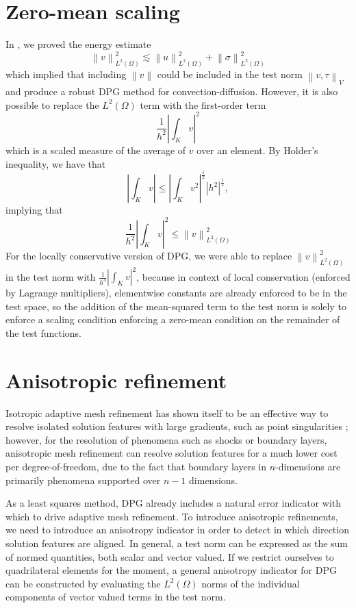 \documentclass[11pt,onecolumn]{scrartcl}
\newcommand{\nor}[1]{\left\| #1 \right\|}
\newcommand{\LRp}[1]{\left( #1 \right)}
\newcommand{\LRb}[1]{\left| #1 \right|}
\renewcommand{\L}{L^2\LRp{\Omega}}
\begin{document}
\section{Zero-mean scaling}

In \cite{DPGrobustness, ChanHeuerBui-ThanhDemkowicz12}, we proved the energy estimate
\[
\nor{v}^2_{\L} \lesssim \nor{u}^2_{\L} + \nor{\sigma}^2_{\L}
\]
which implied that including $\nor{v}$ could be included in the test norm $\nor{v,\tau}_V$ and produce a robust DPG method for convection-diffusion.  However, it is also possible to replace the $\L$ term with the first-order term 
\[
\frac{1}{h^2}\LRb{\int_K v}^2
\]
which is a scaled measure of the average of $v$ over an element.  By Holder's inequality, we have that 
\[
\LRb{\int_K v} \leq \LRb{\int_K v^2}^{\frac{1}{2}} \LRb{h^2}^{\frac{1}{2}}, 
\]
implying that 
\[
\frac{1}{h^2}\LRb{\int_K v}^2 \leq \nor{v}^2_{\L}
\]
For the locally conservative version of DPG, we were able to replace $\nor{v}^2_{\L}$ in the test norm with $\frac{1}{h^4}\LRb{\int_K v}^2$, because in context of local conservation (enforced by Lagrange multipliers), elementwise constants are already enforced to be in the test space, so the addition of the mean-squared term to the test norm is solely to enforce a scaling condition enforcing a zero-mean condition on the remainder of the test functions.

\section{Anisotropic refinement}

Isotropic adaptive mesh refinement has shown itself to be an effective way to resolve isolated solution features with large gradients, such as point singularities \cite{FindBabuskaPaper}; however, for the resolution of phenomena such as shocks or boundary layers, anisotropic mesh refinement can resolve solution features for a much lower cost per degree-of-freedom, due to the fact that boundary layers in $n$-dimensions are primarily phenomena supported over $n-1$ dimensions.  

As a least squares method, DPG already includes a natural error indicator with which to drive adaptive mesh refinement.  To introduce anisotropic refinements, we need to introduce an anisotropy indicator in order to detect in which direction solution features are aligned.  In general, a test norm can be expressed as the sum of normed quantities, both scalar and vector valued.  If we restrict ourselves to quadrilateral elements for the moment, a general anisotropy indicator for DPG can be constructed by evaluating the $\L$ norms of the individual components of vector valued terms in the test norm.  
\end{document}
